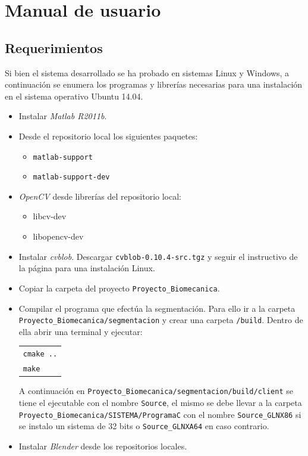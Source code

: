\chapter{Manual de usuario}
\label{manualusuario}

\section{Requerimientos}

Si bien el sistema desarrollado se ha probado en sistemas Linux y Windows, a continuación se enumera los programas y librerías necesarias para una instalación en el sistema operativo Ubuntu 14.04.
\begin{itemize}
\item Instalar \textit{ Matlab R2011b}.
\item Desde el repositorio local los siguientes paquetes:
	\begin{itemize}
		\item \texttt{matlab-support}
		\item \texttt{matlab-support-dev}
	\end{itemize}
\item	\textit{OpenCV} desde librerías del repositorio local:
	\begin{itemize}
		\item libcv-dev
		\item libopencv-dev
	\end{itemize}
\item Instalar \textit{cvblob}\cite{cvblob}. Descargar \texttt{cvblob-0.10.4-src.tgz} y seguir  el instructivo de la página para una instalación Linux.
\item Copiar la carpeta del proyecto \texttt{Proyecto\_Biomecanica}.
\item Compilar el programa que efectúa la segmentación. Para ello ir a la carpeta \texttt{Proyecto\_Biomecanica/segmentacion} y crear una carpeta \texttt{/build}.
Dentro de ella abrir una terminal y ejecutar:
\begin{center}
\begin{tabular}{l}
\texttt{cmake ..}\\
\texttt{make   }
\end{tabular}
\end{center}

A continuación en \texttt{Proyecto\_Biomecanica/segmentacion/build/client} se tiene el ejecutable con el nombre \texttt{Source}, el mismo se debe llevar a la carpeta \texttt{Proyecto\_Biomecanica/SISTEMA/ProgramaC} con el nombre \texttt{Source\_GLNX86} si se instalo un sistema de 32 bits o \texttt{Source\_GLNXA64} en caso contrario.

\item Instalar \textit{Blender} desde los repositorios locales.
\end{itemize}


